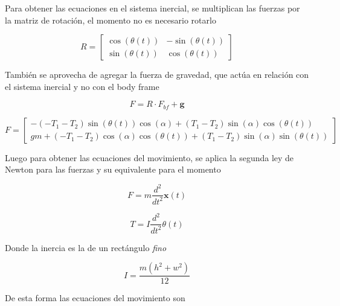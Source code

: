 \documentclass[titlepage, letterpaper]{article}
\begin{document}
Para obtener las ecuaciones en el sistema inercial, se multiplican las fuerzas por la matriz de rotación, el momento no es necesario rotarlo

\begin{equation*}R = \left[\begin{matrix}\cos{\left(\theta{\left(t \right)} \right)} & - \sin{\left(\theta{\left(t \right)} \right)}\\\sin{\left(\theta{\left(t \right)} \right)} & \cos{\left(\theta{\left(t \right)} \right)}\end{matrix}\right]\end{equation*}

También se aprovecha de agregar la fuerza de gravedad, que actúa en relación con el sistema inercial y no con el body frame

\[F = R\cdot F_{bf} + \pmb{g}\]

\begin{equation*}F = \left[\begin{matrix}- \left(- T_{1} - T_{2}\right) \sin{\left(\theta{\left(t \right)} \right)} \cos{\left(\alpha \right)} + \left(T_{1} - T_{2}\right) \sin{\left(\alpha \right)} \cos{\left(\theta{\left(t \right)} \right)}\\g m + \left(- T_{1} - T_{2}\right) \cos{\left(\alpha \right)} \cos{\left(\theta{\left(t \right)} \right)} + \left(T_{1} - T_{2}\right) \sin{\left(\alpha \right)} \sin{\left(\theta{\left(t \right)} \right)}\end{matrix}\right]\end{equation*}

Luego para obtener las ecuaciones del movimiento, se aplica la segunda ley de Newton para las fuerzas y su equivalente para el momento

\begin{equation*}F = m \frac{d^{2}}{d t^{2}} \pmb{x}{\left(t \right)}\end{equation*}

\begin{equation*}T = I \frac{d^{2}}{d t^{2}} \theta{\left(t \right)}\end{equation*}

Donde la inercia es la de un rectángulo \emph{fino}

\begin{equation*}I = \frac{m \left(h^{2} + w^{2}\right)}{12}\end{equation*}

De esta forma las ecuaciones del movimiento son
\end{document}
